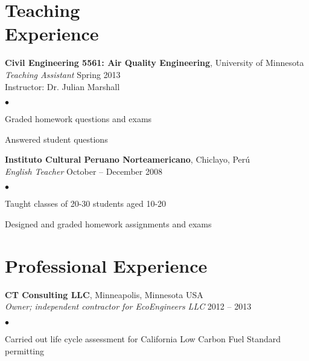 \documentclass[margin,line,10pt]{res}
\newenvironment{list2}{
  \begin{list}{$\bullet$}{%
      \setlength{\itemsep}{0in}
      \setlength{\parsep}{0in} \setlength{\parskip}{0in}
      \setlength{\topsep}{0in} \setlength{\partopsep}{0in} 
      \setlength{\leftmargin}{0.2in}}}{\end{list}}
\begin{document}
\begin{resume}
\section{\sc Teaching\\Experience}

{\bf Civil Engineering 5561: Air Quality Engineering}, University of Minnesota\\
{\em Teaching Assistant} \hfill Spring 2013\\
\vspace{-.3cm}
Instructor: Dr. Julian Marshall\\
\begin{list2}
\item Graded homework questions and exams
\item Answered student questions
\end{list2}

\vspace*{-.1in}

{\bf Instituto Cultural Peruano Norteamericano}, Chiclayo, Per\'{u}\\
\vspace{-.3cm}
{\em English Teacher} \hfill October -- December 2008\\
\begin{list2}
\item Taught classes of 20-30 students aged 10-20
\item Designed and graded homework assignments and exams
\end{list2}


\section{\sc Professional Experience}

{\bf CT Consulting LLC}, Minneapolis, Minnesota USA\\
\vspace{-.3cm}
{\em Owner; independent contractor for EcoEngineers LLC} \hfill 2012 -- 2013\\
\begin{list2}
\item Carried out life cycle assessment for California Low Carbon Fuel Standard permitting
\end{list2}

\vspace*{-.1in}


\end{resume}
\end{document}
